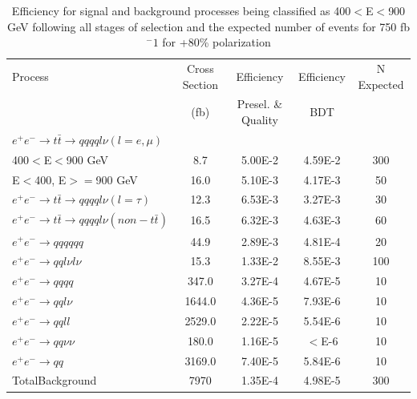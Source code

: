 \begin{table}
  \centering
  \begin{tabular}{l | c | c | c | c}
    \toprule
    Process     & Cross Section & Efficiency & Efficiency & N Expected\\
         & (fb) & Presel. \& Quality & BDT & \\
    \midrule
    $e^+e^-\rightarrow t\bar{t} \rightarrow qqqql\nu (l=e,\mu)$ &  & \\
    400$<$E$<$900 GeV & 8.7 & 5.00E-2 & 4.59E-2 & 300\\
    E$<$400, E$>=$900 GeV & 16.0 & 5.10E-3 & 4.17E-3 & 50\\
   \midrule
    $e^+e^-\rightarrow t\bar{t} \rightarrow qqqql\nu (l=\tau)$& 12.3 & 6.53E-3 & 3.27E-3 & 30\\
    \midrule
    $e^+e^-\rightarrow t\bar{t} \rightarrow qqqql\nu (non-t\bar{t})$& 16.5 & 6.32E-3 & 4.63E-3 & 60\\
    \midrule
    $e^+e^-\rightarrow qqqqqq$ & 44.9 & 2.89E-3 & 4.81E-4 & 20 \\
    \midrule
    $e^+e^-\rightarrow qql\nu l\nu$ & 15.3  & 1.33E-2 & 8.55E-3 & 100 \\
    \midrule
    $e^+e^-\rightarrow qqqq$ & 347.0 & 3.27E-4 & 4.67E-5 & 10 \\
    \midrule
    $e^+e^-\rightarrow qql\nu$ & 1644.0 & 4.36E-5 & 7.93E-6 & 10\\
    \midrule
    $e^+e^-\rightarrow qqll$ & 2529.0 & 2.22E-5 & 5.54E-6 & 10 \\
    \midrule
    $e^+e^-\rightarrow qq\nu\nu$ & 180.0 & 1.16E-5 & $<$E-6 & 10 \\
    \midrule
    $e^+e^-\rightarrow qq$ & 3169.0 & 7.40E-5 & 5.84E-6 & 10 \\
    \midrule
    \midrule
    TotalBackground & 7970 & 1.35E-4 & 4.98E-5 & 300\\
    \bottomrule
  \end{tabular}
  \caption{Efficiency for signal and background processes being classified as 400$<$E$<$900 GeV following all stages of selection and the expected number of events for 750 fb$^-1$ for +80\% polarization}
  \label{table:topfinalefficienciesposLowE}
\end{table}


